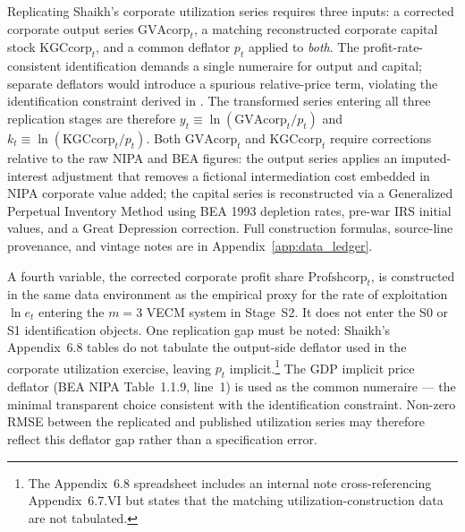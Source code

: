 \documentclass[11pt,a4paper]{article}
\begin{document}
Replicating Shaikh's corporate utilization series requires three inputs: a
corrected corporate output series $\text{GVAcorp}_t$, a matching
reconstructed corporate capital stock $\text{KGCcorp}_t$, and a common
deflator $p_t$ applied to \emph{both}. The profit-rate-consistent
identification demands a single numeraire for output and capital; separate
deflators would introduce a spurious relative-price term, violating the
identification constraint derived in \citet[Appendix~6.6]{Shaikh2016}. The
transformed series entering all three replication stages are therefore
$y_t \equiv \ln(\text{GVAcorp}_t / p_t)$ and $k_t \equiv \ln(\text{KGCcorp}_t
/ p_t)$. Both $\text{GVAcorp}_t$ and $\text{KGCcorp}_t$ require corrections
relative to the raw NIPA and BEA figures: the output series applies an
imputed-interest adjustment that removes a fictional intermediation cost
embedded in NIPA corporate value added; the capital series is reconstructed
via a Generalized Perpetual Inventory Method using BEA 1993 depletion rates,
pre-war IRS initial values, and a Great Depression correction. Full
construction formulas, source-line provenance, and vintage notes are in
Appendix~\ref{app:data_ledger}.

A fourth variable, the corrected corporate profit share
$\text{Profshcorp}_t$, is constructed in the same data environment as the
empirical proxy for the rate of exploitation $\ln e_t$ entering the $m=3$
VECM system in Stage~S2. It does not enter the S0 or S1 identification
objects. One replication gap must be noted: Shaikh's Appendix~6.8 tables do
not tabulate the output-side deflator used in the corporate utilization
exercise, leaving $p_t$ implicit.\footnote{The Appendix~6.8 spreadsheet
	includes an internal note cross-referencing Appendix~6.7.VI but states that
	the matching utilization-construction data are not tabulated.} The GDP
implicit price deflator (BEA NIPA Table~1.1.9, line~1) is used as the
common numeraire --- the minimal transparent choice consistent with the
identification constraint. Non-zero RMSE between the replicated and
published utilization series may therefore reflect this deflator gap rather
than a specification error. 


\end{document}

